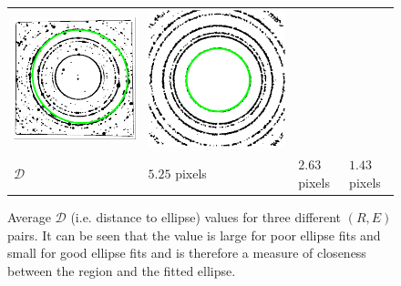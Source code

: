 \documentclass[preprint]{iucr}              %
\begin{document}
\begin{figure}
\begin{tabular}{>{\centering\arraybackslash}m{.1\linewidth}>{\centering\arraybackslash}m{.25\linewidth}>{\centering\arraybackslash}m{.25\linewidth}>{\centering\arraybackslash}m{.25\linewidth}}
\includegraphics[width=\linewidth]{Detail/o_Si12_0001_EF_2_6.png}&
\includegraphics[width=\linewidth]{Detail/o_max1_EF_2_5.png}
\\
$\mathcal{D}$ & $5.25$ pixels & $2.63$ pixels & $1.43$ pixels
\end{tabular}

\caption{Average $\mathcal{D}$ (i.e. distance to ellipse) values for three different $(R, E)$ pairs. It can be seen that the value is large for poor ellipse fits and small for good ellipse fits and is therefore a measure of closeness between the region and the fitted ellipse.}

\label{fig:ade}
\end{figure}
\end{document}
